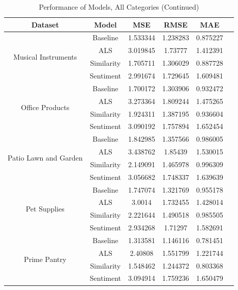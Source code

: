 \documentclass[sigconf,authorversion,nonacm]{acmart}
\begin{document}
         
    \begin{table}
    \ContinuedFloat
        \caption{Performance of Models, All Categories (Continued)}
        \label{tab:perform}
        \begin{tabular}{cccccc}
        
        \toprule
        \textbf{Dataset} & \textbf{Model} & \textbf{MSE} & \textbf{RMSE} & \textbf{MAE} \\ \midrule
        \multirow{4}{*}{Musical Instruments} & Baseline & 1.533344 & 1.238283 & 0.875227 \\
         & ALS & 3.019845 & 1.73777 & 1.412391 \\
         & Similarity & 1.705711 & 1.306029 & 0.887728 \\
         & Sentiment\footnote[1] & 2.991674 & 1.729645 & 1.609481 \\ \midrule
         \multirow{4}{*}{Office Products} & Baseline & 1.700172 & 1.303906 & 0.932472 \\
         & ALS & 3.273364 & 1.809244 & 1.475265 \\
         & Similarity & 1.924311 & 1.387195 & 0.936604 \\
         & Sentiment\footnote[1] & 3.090192 & 1.757894 & 1.652454 \\ \midrule
        \multirow{4}{*}{Patio Lawn and Garden} & Baseline & 1.842985 & 1.357566 & 0.986005 \\
         & ALS & 3.438762 & 1.85439 & 1.530015 \\
         & Similarity & 2.149091 & 1.465978 & 0.996309 \\
         & Sentiment\footnote[1] & 3.056682 & 1.748337 & 1.639639 \\ \midrule
        \multirow{4}{*}{Pet Supplies} & Baseline & 1.747074 & 1.321769 & 0.955178 \\
         & ALS & 3.0014 & 1.732455 & 1.428014 \\
         & Similarity & 2.221644 & 1.490518 & 0.985505 \\
         & Sentiment\footnote[1] & 2.934268 & 1.71297 & 1.582691 \\ \midrule
        \multirow{4}{*}{Prime Pantry} & Baseline & 1.313581 & 1.146116 & 0.781451 \\
         & ALS & 2.40808 & 1.551799 & 1.221744 \\
         & Similarity & 1.548462 & 1.244372 & 0.803368 \\
         & Sentiment\footnote[1] & 3.094914 & 1.759236 & 1.650479 \\ \midrule

\end{tabular}
\end{table}
\end{document}
